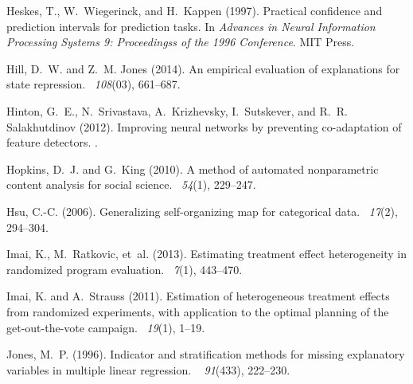 \documentclass[10pt]{book}
\theoremstyle{definition}
\begin{document}
\begin{thebibliography}{11}
Heskes, T., W.~Wiegerinck, and H.~Kappen (1997).
\newblock Practical confidence and prediction intervals for prediction tasks.
\newblock In {\em Advances in Neural Information Processing Systems 9:
  Proceedingss of the 1996 Conference}. MIT Press.

Hill, D.~W. and Z.~M. Jones (2014).
\newblock An empirical evaluation of explanations for state repression.
~{\em 108\/}(03), 661--687.

Hinton, G.~E., N.~Srivastava, A.~Krizhevsky, I.~Sutskever, and R.~R.
  Salakhutdinov (2012).
\newblock Improving neural networks by preventing co-adaptation of feature
  detectors.
.

Hopkins, D.~J. and G.~King (2010).
\newblock A method of automated nonparametric content analysis for social
  science.
~{\em 54\/}(1),
  229--247.

Hsu, C.-C. (2006).
\newblock Generalizing self-organizing map for categorical data.
~{\em 17\/}(2),
  294--304.

Imai, K., M.~Ratkovic, et~al. (2013).
\newblock Estimating treatment effect heterogeneity in randomized program
  evaluation.
~{\em 7\/}(1), 443--470.

Imai, K. and A.~Strauss (2011).
\newblock Estimation of heterogeneous treatment effects from randomized
  experiments, with application to the optimal planning of the get-out-the-vote
  campaign.
~{\em 19\/}(1), 1--19.

Jones, M.~P. (1996).
\newblock Indicator and stratification methods for missing explanatory
  variables in multiple linear regression.
~{\em
  91\/}(433), 222--230.


\end{thebibliography}
\end{document}
